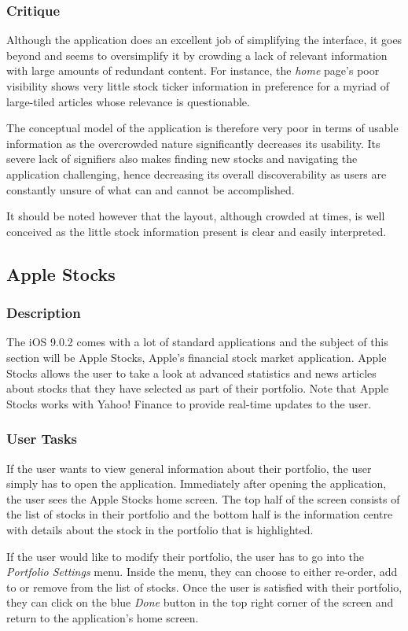 \documentclass{sigchi}
\begin{document}
\subsubsection{Critique}
Although the application does an excellent job of simplifying the interface, it goes beyond and seems to oversimplify it by crowding a lack of relevant information with large amounts of redundant content. For instance, the \textit{home} page's poor visibility shows very little stock ticker information in preference for a myriad of large-tiled articles whose relevance is questionable. \par
The conceptual model of the application is therefore very poor in terms of usable information as the overcrowded nature significantly decreases its usability. Its severe lack of signifiers also makes finding new stocks and navigating the application challenging, hence decreasing its overall discoverability as users are constantly unsure of what can and cannot be accomplished. \par
It should be noted however that the layout, although crowded at times, is well conceived as the little stock information present is clear and easily interpreted.



\subsection{Apple Stocks}
\subsubsection{Description}
The iOS 9.0.2 comes with a lot of standard applications and the subject of this section will be Apple Stocks, Apple's financial stock market application. Apple Stocks allows the user to take a look at advanced statistics and news articles about stocks that they have selected as part of their portfolio. Note that Apple Stocks works with Yahoo! Finance to provide real-time updates to the user.

\subsubsection{User Tasks}
If the user wants to view general information about their portfolio, the user simply has to open the application. Immediately after opening the application, the user sees the Apple Stocks home screen. The top half of the screen consists of the list of stocks in their portfolio and the bottom half is the information centre with details about the stock in the portfolio that is highlighted. \par
If the user would like to modify their portfolio, the user has to go into the \textit{Portfolio Settings} menu. Inside the menu, they can choose to either re-order, add to or remove from the list of stocks. Once the user is satisfied with their portfolio, they can click on the blue \textit{Done} button in the top right corner of the screen and return to the application's home screen.
\end{document}
